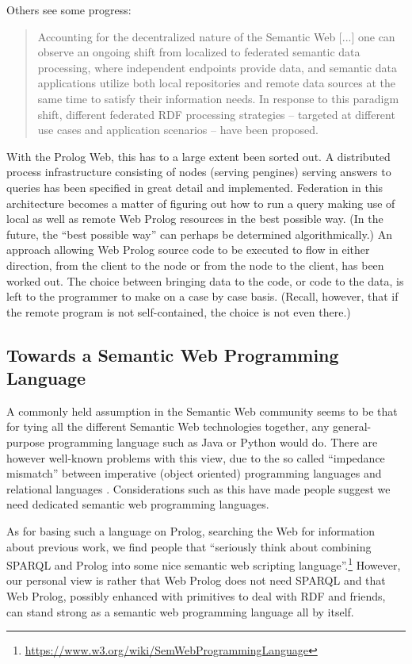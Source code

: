 \documentclass{tlp}
\begin{document}
\noindent Others see some progress:

\begin{quote}
Accounting for the decentralized nature of the Semantic Web [...] one can observe an ongoing shift from localized to federated semantic data processing, where independent endpoints provide data, and semantic data applications utilize both local repositories and remote data sources at the same time to satisfy their information needs. In response to this paradigm shift, different federated RDF processing strategies -- targeted at different use cases and application scenarios -- have been proposed.
\end{quote}

\noindent With the Prolog Web, this has to a large extent been sorted out. A distributed process infrastructure consisting of nodes (serving pengines) serving answers to queries has been specified in great detail and implemented. Federation in this architecture becomes a matter of figuring out how to run a query making use of local as well as remote Web Prolog resources in the best possible way. (In the future, the ``best possible way'' can perhaps be determined algorithmically.) An approach allowing Web Prolog source code to be executed to flow in either direction, from the client to the node or from the node to the client, has been worked out. The choice between bringing data to the code, or code to the data, is left to the programmer to make on a case by case basis. (Recall, however, that if the remote program is not self-contained, the choice is not even there.)


\subsection{Towards a Semantic Web Programming Language}\label{sec:semantic-web-programming-language}

\noindent A commonly held assumption in the Semantic Web community seems to be that for tying all the different Semantic Web technologies together, any general-purpose programming language such as Java or Python would do. There are however well-known problems with this view, due to the so called ``impedance mismatch'' between imperative (object oriented) programming languages and relational languages \cite{wielemaker2016cliopatria}. Considerations such as this have made people suggest we need dedicated semantic web programming languages.

As for basing such a language on Prolog, searching the Web for information about previous work, we find people that ``seriously think about combining SPARQL and Prolog into some nice semantic web scripting language''.\footnote{\url{https://www.w3.org/wiki/SemWebProgrammingLanguage}} However, our personal view is rather that Web Prolog does not need SPARQL and that Web Prolog, possibly enhanced with primitives to deal with RDF and friends, can stand strong as a semantic web programming language all by itself.
\end{document}
